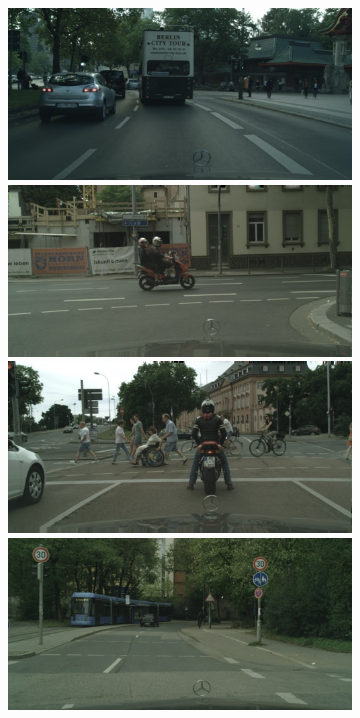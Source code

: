 {\begin{figure}[t]
{{\begin{subfigure}[t]{0.24\linewidth}
\begin{center}
		\includegraphics[width=\linewidth,trim={0px 60px 0 0px},clip]{failure/berlin_000040_000019_leftImg8bit.jpg}
		\includegraphics[width=\linewidth,trim={0px 60px 0 0px},clip]{failure/mainz_000001_031026_leftImg8bit.jpg}
		\includegraphics[width=\linewidth,trim={0px 60px 0 0px},clip]{failure/mainz_000003_014457_leftImg8bit.jpg}
		\includegraphics[width=\linewidth,trim={0px 60px 0 0px},clip]{failure/munich_000252_000019_leftImg8bit.jpg}

\end{center}
\end{subfigure}}}
\end{figure}}
